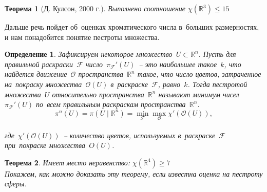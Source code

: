 \documentclass{report}%
\newtheorem{theorem}{Теорема}
\newtheorem{definition}{Определение}
\begin{document}
\begin{theorem}[Д. Кулсон, 2000 г.]
		Выполнено соотношение $\chi(\mathbb{R}^3) \leq 15$
\end{theorem}

\noindent Дальше речь пойдет об~оценках хроматического числа в~больших размерностях, и нам понадобится понятие пестроты множества.

\begin{definition}
		Зафиксируем некоторое множество~$U \subset \mathbb{R}^n$. Пусть для правильной раскраски~$\mathcal{F}$
		число~$\pi_\mathcal{F}'(U)$~– это наибольшее такое~$k$, что найдется движение~$\mathcal{O}$ пространства~$\mathbb{R}^n$ такое,
		что число цветов, затраченное на~покраску множества~$\mathcal{O}(U)$ в~раскраске~$\mathcal{F}$, равно~$k$.
		Тогда пестротой множества~$U$ относительно пространства~$\mathbb{R}^n$ называют
		минимум чисел~$\pi_\mathcal{F}'(U)$ по~всем правильным раскраскам пространства~$\mathbb{R}^n$.
		\begin{equation}
				\pi^n(U) = \pi(U \mid \mathbb{R}^n) = \min_\mathcal{F}\max_\mathcal{O}\chi'(\mathcal{O}(U)),
		\end{equation} \\
		где~$\chi'(\mathcal{O}(U))$~– количество цветов, используемых в~раскраске~$\mathcal{F}$ при~покраске множества~$O(U)$.
\end{definition}

\begin{theorem}
		Имеет место неравенство: $\chi(\mathbb{R}^4) \geq 7$ \\
		Покажем, как можно доказать эту теорему, если известна оценка на пестроту сферы.
\end{theorem}
\end{document}
